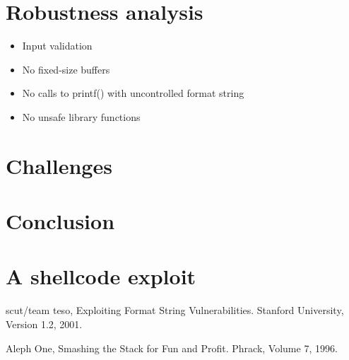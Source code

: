 \documentclass[12pt]{article}
\begin{document}
\section{Robustness analysis}
\begin{itemize}
  \item Input validation
  \item No fixed-size buffers
  \item No calls to printf() with uncontrolled format string
  \item No unsafe library functions
\end{itemize}

\section{Challenges}

\section{Conclusion}

\appendix
\section{A shellcode exploit}

\begin{thebibliography}{9}

  scut/team teso,
  Exploiting Format String Vulnerabilities.
  Stanford University,
  Version 1.2,
  2001.

  Aleph One,
  Smashing the Stack for Fun and Profit.
  Phrack,
  Volume 7,
  1996.
\end{thebibliography}
\end{document}
